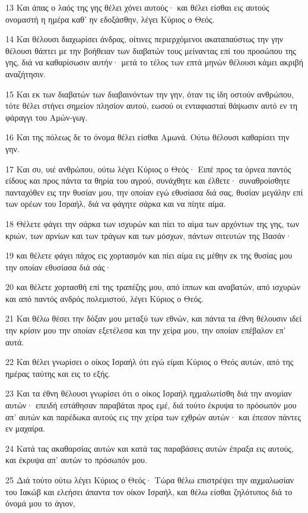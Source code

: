 \par 13 Και άπας ο λαός της γης θέλει χόνει αυτούς· και θέλει είσθαι εις αυτούς ονομαστή η ημέρα καθ' ην εδοξάσθην, λέγει Κύριος ο Θεός.
\par 14 Και θέλουσι διαχωρίσει άνδρας, οίτινες περιερχόμενοι ακαταπαύστως την γην θέλουσι θάπτει με την βοήθειαν των διαβατών τους μείναντας επί του προσώπου της γης, διά να καθαρίσωσιν αυτήν· μετά το τέλος των επτά μηνών θέλουσι κάμει ακριβή αναζήτησιν.
\par 15 Και εκ των διαβατών των διαβαινόντων την γην, όταν τις ίδη οστούν ανθρώπου, τότε θέλει στήνει σημείον πλησίον αυτού, εωσού οι ενταφιασταί θάψωσιν αυτό εν τη φάραγγι του Αμών-γωγ.
\par 16 Και της πόλεως δε το όνομα θέλει είσθαι Αμωνά. Ούτω θέλουσι καθαρίσει την γην.
\par 17 Και συ, υιέ ανθρώπου, ούτω λέγει Κύριος ο Θεός· Ειπέ προς τα όρνεα παντός είδους και προς πάντα τα θηρία του αγρού, συνάχθητε και έλθετε· συναθροίσθητε πανταχόθεν εις την θυσίαν μου, την οποίαν εγώ εθυσίασα διά σας, θυσίαν μεγάλην επί των ορέων του Ισραήλ, διά να φάγητε σάρκα και να πίητε αίμα.
\par 18 Θέλετε φάγει την σάρκα των ισχυρών και πίει το αίμα των αρχόντων της γης, των κριών, των αρνίων και των τράγων και των μόσχων, πάντων σιτευτών της Βασάν·
\par 19 και θέλετε φάγει πάχος εις χορτασμόν και πίει αίμα εις μέθην εκ της θυσίας μου την οποίαν εθυσίασα διά σάς·
\par 20 και θέλετε χορτασθή επί της τραπέζης μου, από ίππων και αναβατών, από ισχυρών και από παντός ανδρός πολεμιστού, λέγει Κύριος ο Θεός.
\par 21 Και θέλω θέσει την δόξαν μου μεταξύ των εθνών, και πάντα τα έθνη θέλουσιν ιδεί την κρίσιν μου την οποίαν εξετέλεσα και την χείρα μου, την οποίαν επέβαλον επ' αυτά.
\par 22 Και θέλει γνωρίσει ο οίκος Ισραήλ ότι εγώ είμαι Κύριος ο Θεός αυτών, από της ημέρας ταύτης και εις το εξής.
\par 23 Και τα έθνη θέλουσι γνωρίσει ότι ο οίκος Ισραήλ ηχμαλωτίσθη διά την ανομίαν αυτών· επειδή εστάθησαν παραβάται προς εμέ, διά τούτο έκρυψα το πρόσωπόν μου απ' αυτών και παρέδωκα αυτούς εις την χείρα των εχθρών αυτών· και έπεσον πάντες εν μαχαίρα.
\par 24 Κατά τας ακαθαρσίας αυτών και κατά τας παραβάσεις αυτών έπραξα εις αυτούς, και έκρυψα απ' αυτών το πρόσωπόν μου.
\par 25 Διά τούτο ούτω λέγει Κύριος ο Θεός· Τώρα θέλω επιστρέψει την αιχμαλωσίαν του Ιακώβ και ελεήσει άπαντα τον οίκον Ισραήλ, και θέλω είσθαι ζηλότυπος διά το όνομά μου το άγιον,
